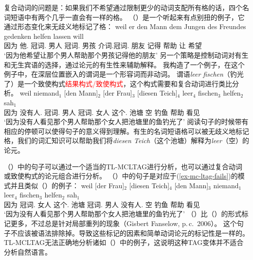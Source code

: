 复合动词的问题是：如果我们不希望通过限制更少的动词支配所有格的话，四个名词短语中有两个几乎一直会有一样的格。
（）是一个听起来有点别扭的例子，它通过形态变化来无歧义地标记了格：
\ea
\gll weil    er        den        Mann dem        Jungen des Freundes gedenken helfen lassen will\\
     因为 他.\nom{} 冠词.\acc{} 男人  冠词.\dat{} 男孩    介词.冠词.\gen{} 朋友 记得 帮助 让 希望 \\
\glt `因为他希望让那个男人帮助那个男孩记得他的朋友' 
\z
另一个策略是控制动词对有生和无生宾语的选择，通过论元的有生性来辅助解释。
我构造了一个例子，在这个例子中，在深层位置嵌入的谓词是一个形容词而非动词。
谓语\emph{leer fischen}（钓光了）是一个致使构式\textcolor{red}{结果构式/致使构式}，这个构式需要和复合动词进行类比分析\citep[\S 5]{Mueller2002b}。
\ea
\gll weil niemand$_1$ [den Mann]$_2$ [der Frau]$_3$ [diesen Teich]$_4$  leer$_4$ fischen$_3$ helfen$_2$ sah$_1$\\
     因为 没有人.\nom{} \spacebr{}冠词.\acc{} 男人 \spacebr{}冠词.\dat{} 女人 \spacebr{}这个.\acc{} 池塘 空 钓鱼 帮助 看见 \\
\glt `因为没有人看见那个男人帮助那个女人把池塘里的鱼钓光了' 
\z
阅读句子的时候带有相应的停顿可以使得句子的意义得到理解。有生的名词短语格可以被无歧义地标记格，我们的词汇知识可以帮助我们将\emph{diesen Teich}（这个池塘）解释为\emph{leer}（空）的论元。 

（）中的句子可以通过一个适当的TL-MCLTAG进行分析，也可以通过复合动词或致使构式的论元组合进行分析。
（）中的句子是对应于(\ref{ex-mc-ltag-fails})的模式并且类似（）的例子：
\ea
\gll weil [der Frau]$_2$ [diesen Teich]$_4$ [den Mann]$_3$ niemand$_1$ leer$_4$ fischen$_3$ helfen$_2$ sah$_1$\\
  因为 \spacebr{}冠词.\dat{} 女人 \spacebr{}这个.\acc{} 池塘 \spacebr{}冠词.\acc{} 男人 没有人.\nom{} 空 钓鱼 帮助 看见 \\
\glt `因为没有人看见那个男人帮助那个女人把池塘里的鱼钓光了'
\z
（）比（）的形式标记更多，不过总是针对局部重列的现象（Gisbert Fanselow, p.\,c.\ 2006）。
这个句子不应该被语法排除掉。导致这些标记的因素和简单动词论元的标记性是一样的。
TL-MCLTAG无法正确地分析诸如（）中的例子，这说明这种TAG变体并不适合分析自然语言。

